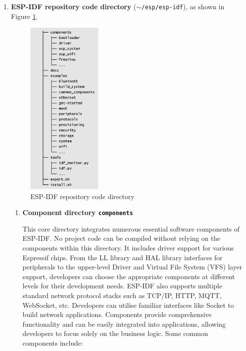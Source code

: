 \documentclass[a4paper,12pt,openany]{book}
\begin{document}
\begin{enumerate}[label=(\arabic*),leftmargin=2em]
    \item \textbf{ESP-IDF repository code directory} (\texttt{$\sim$/esp/esp-idf}), as shown in Figure \ref{ESP-IDF repository code directory}.

    \begin{figure}[h!]
        \centering
        \includegraphics[width=0.35\textwidth]{D4Z/4-2}
        \caption{ESP-IDF repository code directory}
        \label{ESP-IDF repository code directory}
    \end{figure}

    \begin{enumerate}[label=\textbf{\alph*.},leftmargin=0em]
        \item \textbf{Component directory \texttt{components}}

        This core directory integrates numerous essential software components of ESP-IDF. No project code can be compiled without relying on the components within this directory. It includes driver support for various Espressif chips. From the LL library and HAL library interfaces for peripherals to the upper-level Driver and Virtual File System (VFS) layer support, developers can choose the appropriate components at different levels for their development needs. ESP-IDF also supports multiple standard network protocol stacks such as TCP/IP, HTTP, MQTT, WebSocket, etc. Developers can utilise familiar interfaces like Socket to build network applications. Components provide comprehensive functionality and can be easily integrated into applications, allowing developers to focus solely on the business logic. Some common components include:


\end{enumerate}
\end{enumerate}
\end{document}
